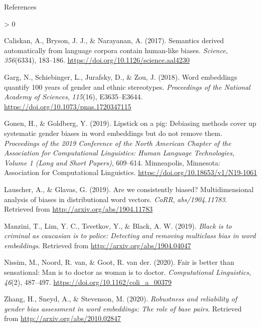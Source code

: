 \documentclass[
  10pt,
  ignorenonframetext,
  x11names, dvipsnames, bibspacing,natbib]{beamer}
\newlength{\cslhangindent}
\newenvironment{CSLReferences}[2] %
 {%
  \setlength{\parindent}{0pt}
  \ifodd #1 \everypar{\setlength{\hangindent}{\cslhangindent}}\ignorespaces\fi
  \ifnum #2 > 0
  \setlength{\parskip}{#2\baselineskip}
  \fi
 }%
 {}
\begin{document}
\begin{frame}{References}
\protect\hypertarget{references}{}
\tiny

\hypertarget{refs}{}
\begin{CSLReferences}{1}{0}
\leavevmode\hypertarget{ref-Caliskan2017semanticsBiases}{}%
Caliskan, A., Bryson, J. J., \& Narayanan, A. (2017). Semantics derived
automatically from language corpora contain human-like biases.
\emph{Science}, \emph{356}(6334), 183--186.
\url{https://doi.org/10.1126/science.aal4230}

\leavevmode\hypertarget{ref-Garg2018years}{}%
Garg, N., Schiebinger, L., Jurafsky, D., \& Zou, J. (2018). Word
embeddings quantify 100 years of gender and ethnic stereotypes.
\emph{Proceedings of the National Academy of Sciences}, \emph{115}(16),
E3635--E3644. \url{https://doi.org/10.1073/pnas.1720347115}

\leavevmode\hypertarget{ref-Gonen2019lipstick}{}%
Gonen, H., \& Goldberg, Y. (2019). Lipstick on a pig: {D}ebiasing
methods cover up systematic gender biases in word embeddings but do not
remove them. \emph{Proceedings of the 2019 Conference of the North
{A}merican Chapter of the Association for Computational Linguistics:
Human Language Technologies, Volume 1 (Long and Short Papers)},
609--614. Minneapolis, Minnesota: Association for Computational
Linguistics. \url{https://doi.org/10.18653/v1/N19-1061}

\leavevmode\hypertarget{ref-Lauscher2019multidimensional}{}%
Lauscher, A., \& Glavas, G. (2019). Are we consistently biased?
Multidimensional analysis of biases in distributional word vectors.
\emph{CoRR}, \emph{abs/1904.11783}. Retrieved from
\url{http://arxiv.org/abs/1904.11783}

\leavevmode\hypertarget{ref-Manzini2019blackToCriminal}{}%
Manzini, T., Lim, Y. C., Tsvetkov, Y., \& Black, A. W. (2019).
\emph{Black is to criminal as caucasian is to police: Detecting and
removing multiclass bias in word embeddings}. Retrieved from
\url{http://arxiv.org/abs/1904.04047}

\leavevmode\hypertarget{ref-Nissim2020fair}{}%
Nissim, M., Noord, R. van, \& Goot, R. van der. (2020). Fair is better
than sensational: Man is to doctor as woman is to doctor.
\emph{Computational Linguistics}, \emph{46}(2), 487--497.
\url{https://doi.org/10.1162/coli_a_00379}

\leavevmode\hypertarget{ref-zhang2020robustness}{}%
Zhang, H., Sneyd, A., \& Stevenson, M. (2020). \emph{Robustness and
reliability of gender bias assessment in word embeddings: The role of
base pairs}. Retrieved from \url{http://arxiv.org/abs/2010.02847}

\end{CSLReferences}
\end{frame}
\end{document}
